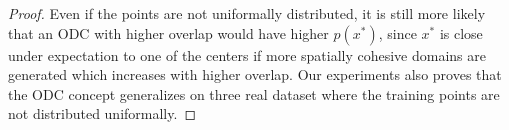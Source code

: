 \begin{proof}
Even if the points are not uniformally distributed, it is still more likely that an ODC with higher overlap would have higher $p(x^*)$, since $x^*$ is close under expectation to one of the centers if more spatially cohesive domains are generated which increases with higher overlap. Our experiments also proves that the ODC concept generalizes on three real dataset where the training points are not distributed uniformally.  
\end{proof}

\vspace{-2mm}


